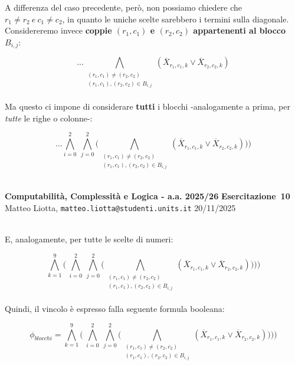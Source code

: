\documentclass[a4paper,10pt]{article}
\makeatletter
\newcommand{\EsercitazioneNum}{10}
\newcommand{\Data}{20/11/2025}
\newcommand{\DocType}{Esercitazione} %
\newcommand{\FullTitle}{\DocType\ \EsercitazioneNum}
\newcommand{\Header}{
\noindent
  \small \textbf{Computabilità, Complessità e Logica - a.a. 2025/26} \hfill \textbf{\FullTitle} \\[0.2cm]
  \scriptsize Matteo Liotta, \texttt{matteo.liotta@studenti.units.it} \hfill \Data \\[0.2cm]
  \noindent\makebox[\linewidth]{\rule{\linewidth}{0.4pt}} \\[0.3cm]}
\newcommand{\NewPageHeader}{
  \vfill
  \noindent\makebox[\linewidth]{\rule{\linewidth}{0.4pt}}
  \newpage
  {\Header}
}
\makeatother
\begin{document}
{\begin{itemize}[label=, leftmargin=0pt]
\begin{osservazioni}
A differenza del caso precedente, però, non possiamo chiedere che $r_1\ne r_2 \ e \ c_1\ne c_2$, in quanto le uniche scelte sarebbero i termini sulla diagonale. Considereremo invece \textbf{coppie $(r_1,c_1)$ e $(r_2,c_2)$ appartenenti al blocco $B_{i,j}$}:

    $$... \bigwedge\limits_{\begin{array}{c}
         (r_1,c_1)\ne(r_2,c_2)\\
         (r_1,c_1),(r_2,c_2)\in B_{i,j}
    \end{array}} (\overline X_{r_1,c_1,k} \lor \overline X_{r_2,c_2,k})
    $$\\

Ma questo ci impone di considerare \textbf{tutti} i blocchi -analogamente a prima, per \textit{tutte} le righe o colonne-:

$$... \bigwedge\limits_{i=0}^2\ \bigwedge\limits_{j=0}^2\bigg(\bigwedge\limits_{\begin{array}{c}
         (r_1,c_1)\ne(r_2,c_2)\\
         (r_1,c_1),(r_2,c_2)\in B_{i,j}
    \end{array}} (\overline X_{r_1,c_1,k} \lor \overline X_{r_2,c_2,k})
    \bigg)\bigg)$$\\

\end{osservazioni}
\NewPageHeader
\begin{osservazioni}

E, analogamente, per tutte le scelte di numeri:

$$\bigwedge\limits_{k=1}^9\bigg(\ \bigwedge\limits_{i=0}^2\ \bigwedge\limits_{j=0}^2\bigg(\bigwedge\limits_{\begin{array}{c}
         (r_1,c_1)\ne(r_2,c_2)\\
         (r_1,c_1),(r_2,c_2)\in B_{i,j}
    \end{array}} (\overline X_{r_1,c_1,k} \lor \overline X_{r_2,c_2,k})
    \bigg)\bigg)\bigg)$$\\


Quindi, il vincolo è espresso falla seguente formula booleana:

$$\phi_{blocchi}=\bigwedge\limits_{k=1}^9\bigg(\ \bigwedge\limits_{i=0}^2\ \bigwedge\limits_{j=0}^2\bigg(\bigwedge\limits_{\begin{array}{c}
         (r_1,c_1)\ne(r_2,c_2)\\
         (r_1,c_1),(r_2,c_2)\in B_{i,j}
    \end{array}} (\overline X_{r_1,c_1,k} \lor \overline X_{r_2,c_2,k})
    \bigg)\bigg)\bigg)$$\\



\end{osservazioni}
\end{itemize}}
\end{document}
